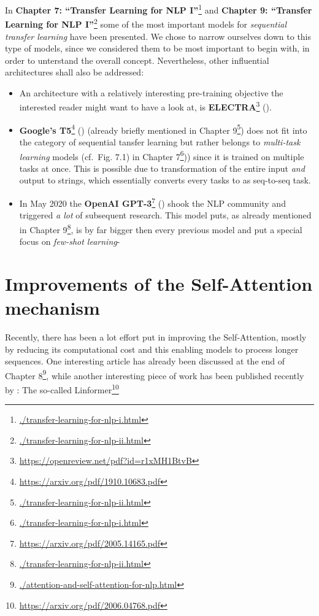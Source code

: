 \documentclass[]{krantz}
\providecommand{\tightlist}{%
  \setlength{\itemsep}{0pt}\setlength{\parskip}{0pt}}
\renewcommand{\href}[2]{#2\footnote{\url{#1}}}
\begin{document}
In \href{./transfer-learning-for-nlp-i.html}{\textbf{Chapter 7: ``Transfer Learning for NLP I''}} and \href{./transfer-learning-for-nlp-ii.html}{\textbf{Chapter 9: ``Transfer Learning for NLP I''}} some of the most important models for \emph{sequential transfer learning} have been presented. We chose to narrow ourselves down to this type of models, since we considered them to be most important to begin with, in order to unterstand the overall concept. Nevertheless, other influential architectures shall also be addressed:

\begin{itemize}
\tightlist
\item
  An architecture with a relatively interesting pre-training objective the interested reader might want to have a look at, is \href{https://openreview.net/pdf?id=r1xMH1BtvB}{\textbf{ELECTRA}} (\citet{Clark2020ELECTRA}).
\item
  \href{https://arxiv.org/pdf/1910.10683.pdf}{\textbf{Google's T5}} (\citet{raffel2019exploring}) (already briefly mentioned in \href{./transfer-learning-for-nlp-ii.html}{Chapter 9}) does not fit into the category of sequential tansfer learning but rather belongs to \emph{multi-task learning} models (cf.~Fig. 7.1) in \href{./transfer-learning-for-nlp-i.html}{Chapter 7})) since it is trained on multiple tasks at once. This is possible due to transformation of the entire input \emph{and} output to strings, which essentially converts every tasks to as seq-to-seq task.
\item
  In May 2020 the \href{https://arxiv.org/pdf/2005.14165.pdf}{\textbf{OpenAI GPT-3}} (\citet{brown2020language}) shook the NLP community and triggered \emph{a lot} of subsequent research. This model puts, as already mentioned in \href{./transfer-learning-for-nlp-ii.html}{Chapter 9}, is by far bigger then every previous model and put a special focus on \emph{few-shot learning}-
\end{itemize}

\hypertarget{improvements-of-the-self-attention-mechanism}{%
\section{Improvements of the Self-Attention mechanism}\label{improvements-of-the-self-attention-mechanism}}

Recently, there has been a lot effort put in improving the Self-Attention, mostly by reducing its computational cost
and this enabling models to process longer sequences. One interesting article has already been discussed at the end of \href{./attention-and-self-attention-for-nlp.html}{Chapter 8}, while another interesting piece of work has been published recently by \citet{wang2020linformer}: The so-called \href{https://arxiv.org/pdf/2006.04768.pdf}{Linformer}
\end{document}
